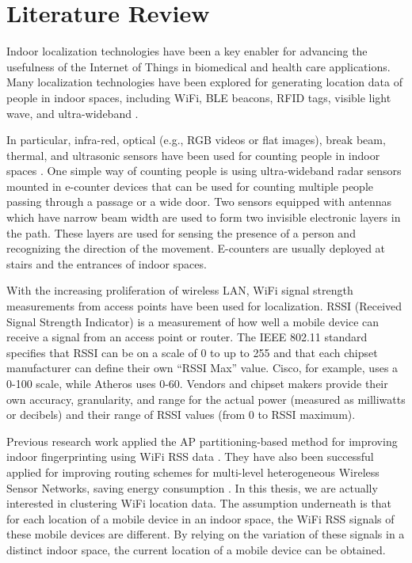 \setlength{\parindent}{2em}
% 
\chapter{Literature Review}

Indoor localization technologies have been a key enabler for advancing the usefulness of the Internet of Things in biomedical and health care applications. Many localization technologies have been explored for generating location data of people in indoor spaces, including WiFi, BLE beacons, RFID tags, visible light wave, and ultra-wideband \cite{namiot2015indoor, jeon2018ble}. 

In particular, infra-red, optical (e.g., RGB videos or flat images), break beam, thermal, and ultrasonic sensors have been used for counting people in indoor spaces \cite{mautz2012indoor}. One simple way of counting people is using ultra-wideband radar sensors mounted in e-counter devices that can be used for counting multiple people passing through a passage or a wide door. Two sensors equipped with antennas which have narrow beam width are used to form two invisible electronic layers in the path. These layers are used for sensing the presence of a person and recognizing the direction of the movement.  E-counters are usually deployed at stairs and the entrances of indoor spaces. 

With the increasing proliferation of wireless LAN, WiFi signal strength measurements from access points have been used for localization. RSSI (Received Signal Strength Indicator) is a measurement of how well a mobile device can receive a signal from an access point or router. The IEEE 802.11 standard specifies that RSSI can be on a scale of 0 to up to 255 and that each chipset manufacturer can define their own “RSSI Max” value. Cisco, for example, uses a 0-100 scale, while Atheros uses 0-60. Vendors and chipset makers provide their own accuracy, granularity, and range for the actual power (measured as milliwatts or decibels) and their range of RSSI values (from 0 to RSSI maximum). 

Previous research work applied the AP partitioning-based method for improving indoor fingerprinting using WiFi RSS data \cite{hu2015improving, subedi2019improving}. They have also been successful applied for improving routing schemes for multi-level heterogeneous Wireless Sensor Networks, saving energy consumption \cite{wang2019affinity}. In this thesis, we are actually interested in clustering WiFi location data. The assumption underneath is that for each location of a mobile device in an indoor space, the WiFi RSS signals of these mobile devices are different. By relying on the variation of these signals in a distinct indoor space, the current location of a mobile device can be obtained.

